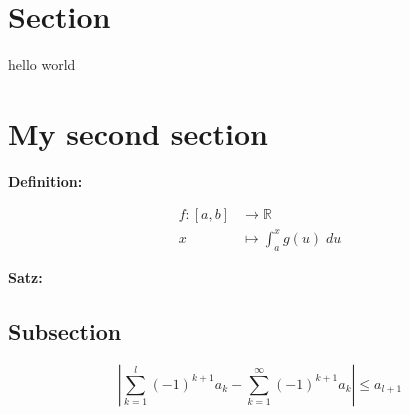 \documentclass[12pt, a4paper]{article}
\begin{document}
	
	\setformat
	
	\section{Section}
	\begin{fullbox}
		hello world
	\end{fullbox}
	\section{My second section}
	\textbf{Definition:} \lipsum[13]
	
	\begin{fullbox}
	 	\begin{align*}
	 		f:[a,b] &\rightarrow \mathbb{R}\\
	 		x &\mapsto \int_a^x g(u)\; du
	 	\end{align*}
	\end{fullbox}
	
	\begin{outline}
		\textbf{Satz:} \lipsum[28]
	 
	\end{outline}
	 	
	\subsection{Subsection}
	
	\[\left| \sum_{k=1}^l (-1)^{k+1} a_k -\sum_{k=1}^\infty (-1)^{k+1} a_k\right| \leq a_{l+1}\]\
	
\end{document}
